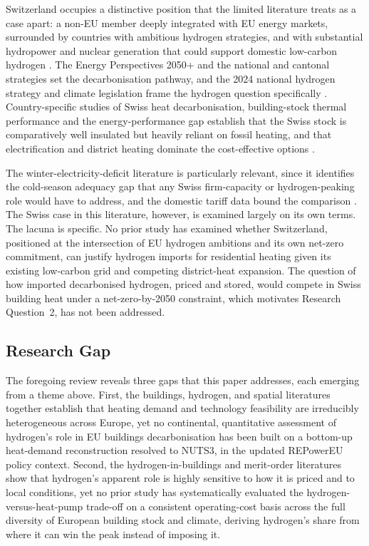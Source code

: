 Switzerland occupies a distinctive position that the limited literature treats as a case
apart: a non-EU member deeply integrated with EU energy markets, surrounded by countries
with ambitious hydrogen strategies, and with substantial hydropower and nuclear
generation that could support domestic low-carbon hydrogen
\citep{Gabrielli2020,BfE2023}. The Energy Perspectives 2050+ and the national and
cantonal strategies set the decarbonisation pathway, and the 2024 national hydrogen
strategy and climate legislation frame the hydrogen question specifically
\citep{SFOE2023perspectives,EnDK2022plus}. Country-specific studies of Swiss heat
decarbonisation, building-stock thermal performance and the energy-performance gap
establish that the Swiss stock is comparatively well insulated but heavily reliant on
fossil heating, and that electrification and district heating dominate the
cost-effective options \citep{Narula2018Strategies,Streicher2018Assessment}.

The winter-electricity-deficit literature is particularly relevant, since it identifies
the cold-season adequacy gap that any Swiss firm-capacity or hydrogen-peaking role would
have to address, and the domestic tariff data bound the comparison
\citep{Mellot2024Mitigating, ElCom2025tariffs}. The Swiss case in this literature,
however, is examined largely on its own terms. The lacuna is specific. No prior study
has examined whether Switzerland, positioned at the intersection of EU hydrogen
ambitions and its own net-zero commitment, can justify hydrogen imports for residential
heating given its existing low-carbon grid and competing district-heat expansion. The
question of how imported decarbonised hydrogen, priced and stored, would compete in
Swiss building heat under a net-zero-by-2050 constraint, which motivates Research
Question~2, has not been addressed.

\subsection{Research Gap}
\label{sec:lit:gap}

The foregoing review reveals three gaps that this paper addresses, each emerging
from a theme above. First, the buildings, hydrogen, and spatial literatures
together establish that heating demand and technology feasibility are
irreducibly heterogeneous across Europe, yet no continental,
quantitative assessment of hydrogen's role in EU buildings
decarbonisation has been built on a bottom-up heat-demand reconstruction resolved to
NUTS3, in the updated REPowerEU policy
context. Second, the hydrogen-in-buildings and merit-order literatures show that
hydrogen's apparent role is highly sensitive to how it is priced and to local
conditions, yet no prior study has systematically evaluated the
hydrogen-versus-heat-pump trade-off on a consistent operating-cost basis across the
full diversity of European building stock and climate, deriving hydrogen's share
from where it can win the peak instead of imposing it.

